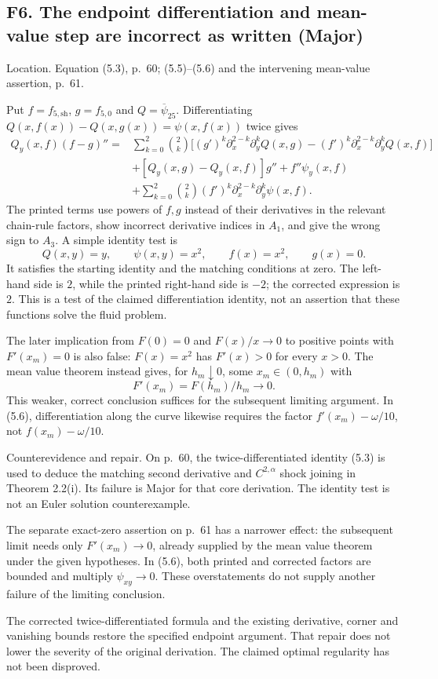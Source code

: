 \documentclass[10pt]{article}
\begin{document}
\subsection*{F6. The endpoint differentiation and mean-value step are incorrect as written (Major)}
Location. Equation (5.3), p. 60; (5.5)–(5.6) and the intervening mean-value assertion, p. 61.\par
Put \(f=f_{5,\mathrm{sh}}\), \(g=f_{5,0}\) and \(Q=\overline\psi_{25}\). Differentiating \(Q(x,f(x))-Q(x,g(x))=\psi(x,f(x))\) twice gives \[\begin{aligned}
 Q_y(x,f)(f-g)''={}&
 \sum_{k=0}^2\binom2k
 \bigl[(g')^k\partial_x^{2-k}\partial_y^kQ(x,g)
       -(f')^k\partial_x^{2-k}\partial_y^kQ(x,f)\bigr]\\
 &+[Q_y(x,g)-Q_y(x,f)]g''
   +f''\psi_y(x,f)\\
 &+\sum_{k=0}^2\binom2k
     (f')^k\partial_x^{2-k}\partial_y^k\psi(x,f).\end{aligned}\] The printed terms use powers of \(f,g\) instead of their derivatives in the relevant chain-rule factors, show incorrect derivative indices in \(A_1\), and give the wrong sign to \(A_3\). A simple identity test is \[Q(x,y)=y,\qquad \psi(x,y)=x^2,\qquad f(x)=x^2,\qquad g(x)=0.\] It satisfies the starting identity and the matching conditions at zero. The left-hand side is \(2\), while the printed right-hand side is \(-2\); the corrected expression is \(2\). This is a test of the claimed differentiation identity, not an assertion that these functions solve the fluid problem.\par
The later implication from \(F(0)=0\) and \(F(x)/x\to0\) to positive points with \(F'(x_m)=0\) is also false: \(F(x)=x^2\) has \(F'(x)>0\) for every \(x>0\). The mean value theorem instead gives, for \(h_m\downarrow0\), some \(x_m\in(0,h_m)\) with \[F'(x_m)=F(h_m)/h_m\longrightarrow0.\] This weaker, correct conclusion suffices for the subsequent limiting argument. In (5.6), differentiation along the curve likewise requires the factor \(f'(x_m)-\omega/10\), not \(f(x_m)-\omega/10\).\par
Counterevidence and repair. On p. 60, the twice-differentiated identity (5.3) is used to deduce the matching second derivative and \(C^{2,\alpha}\) shock joining in Theorem 2.2(i). Its failure is Major for that core derivation. The identity test is not an Euler solution counterexample.\par
The separate exact-zero assertion on p. 61 has a narrower effect: the subsequent limit needs only \(F'(x_m)\to0\), already supplied by the mean value theorem under the given hypotheses. In (5.6), both printed and corrected factors are bounded and multiply \(\psi_{xy}\to0\). These overstatements do not supply another failure of the limiting conclusion.\par
The corrected twice-differentiated formula and the existing derivative, corner and vanishing bounds restore the specified endpoint argument. That repair does not lower the severity of the original derivation. The claimed optimal regularity has not been disproved.\par
\end{document}
